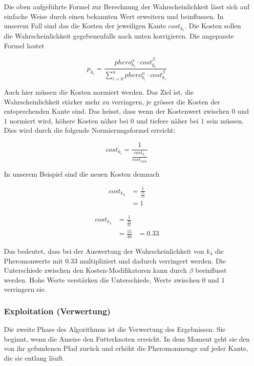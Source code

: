 Die oben aufgeführte Formel zur Berechnung der Wahrscheinlichkeit lässt sich auf einfache Weise durch einen bekannten Wert erweitern und beinflussen. In unserem Fall sind das die Kosten der jeweiligen Kante $cost_{k_i}$. Die Kosten sollen die Wahrscheinlichkeit gegebenenfalls nach unten korrigieren. Die angepasste Formel lautet

\[ p_{k_i} = \frac{phero_{k_i}^\alpha \cdot cost_{k_i}^\beta}{\sum\nolimits_{i=0}^n phero_{k_i}^\alpha \cdot cost_{k_i}^\beta} \] 

Auch hier müssen die Kosten normiert werden. Das Ziel ist, die Wahrscheinlichkeit stärker mehr zu verringern, je grösser die Kosten der entsprechenden Kante sind. Das heisst, dass wenn der Kostenwert zwischen $0$ und $1$ normiert wird, höhere Kosten näher bei $0$ und tiefere näher bei $1$ sein müssen. Dies wird durch die folgende Normierungsformel erreicht:

\[ cost_{k_i} = \frac{1}{\frac{cost_{k_i}}{cost_{min}}} \]

In unserem Beispiel sind die neuen Kosten demnach

\begin{equation*}
\begin{split}
cost_{k_3} & = \frac{1}{\frac{15}{15}} \\
           & = 1
\end{split}
\end{equation*}

\begin{equation*}
\begin{split}
cost_{k_4} & = \frac{1}{\frac{46}{15}} \\
           & = \frac{15}{46}
           & = 0.33
\end{split}
\end{equation*}

Das bedeutet, dass bei der Auswertung der Wahrscheinlichkeit von $k_4$ die Pheromonwerte mit $0.33$ multipliziert und dadurch verringert werden. Die Unterschiede zwischen den Kosten-Modifikatoren kann durch $\beta$ beeinflusst werden. Hohe Werte verstärken die Unterschiede, Werte zwischen $0$ und $1$ verringern sie.

\subsubsection*{Exploitation (Verwertung)}

Die zweite Phase des Algorithmus ist die Verwertung des Ergebnissen. Sie beginnt, wenn die Ameise den Futterknoten erreicht. In dem Moment geht sie den von ihr gefundenen Pfad zurück und erhöht die Pheromonmenge auf jeder Kante, die sie entlang läuft.

